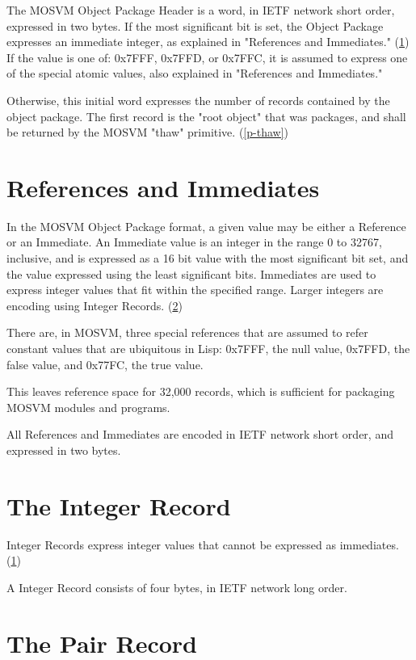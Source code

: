 \documentclass[notitlepage,oneside]{book}
\begin{document}
The MOSVM Object Package Header is a word, in IETF network short order, expressed in two bytes.  If the most significant bit is set, the Object Package 
expresses an immediate integer, as explained in "References and Immediates." (\ref{refs})  If the value is one of: 0x7FFF, 0x7FFD, or 0x7FFC, it is assumed to express one of the special atomic values, also explained in "References and Immediates."

Otherwise, this initial word expresses the number of records contained by the object package.  The first record is the "root object" that was packages, and shall be returned by the MOSVM "thaw" primitive. (\ref{p-thaw})

\section{References and Immediates}
\label{refs}

In the MOSVM Object Package format, a given value may be either a Reference or an Immediate.  An Immediate value is an integer in the range 0 to 32767, inclusive, and is expressed as a 16 bit value with the most significant bit set, and the value expressed using the least significant bits.  Immediates are used to express integer values that fit within the specified range.  Larger integers are encoding using Integer Records. (\ref{int-record})

There are, in MOSVM, three special references that are assumed to refer constant values that are ubiquitous in Lisp: 0x7FFF, the null value, 0x7FFD, the false value, and 0x77FC, the true value.

This leaves reference space for 32,000 records, which is sufficient for packaging MOSVM modules and programs.

All References and Immediates are encoded in IETF network short order, and expressed in two bytes.

\section{The Integer Record}
\label{int-record}

Integer Records express integer values that cannot be expressed as immediates. (\ref{refs}) 

A Integer Record consists of four bytes, in IETF network long order.  

\section{The Pair Record}
\label{pair-record}
\end{document}

